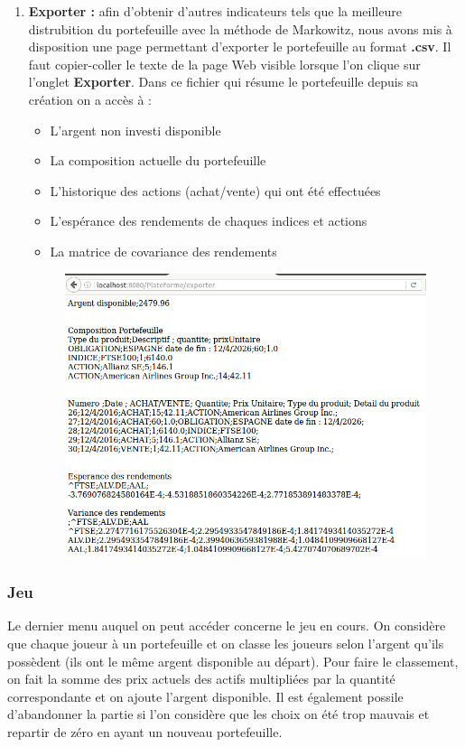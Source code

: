 \begin{enumerate}
\begin{enumerate}
      \end{enumerate}

      \item \textbf{Exporter :} afin d'obtenir d'autres indicateurs tels que la meilleure distrubition du portefeuille avec la méthode de Markowitz, nous avons mis à disposition une page permettant d'exporter le portefeuille au format \textbf{.csv}. Il faut copier-coller le texte de la page Web visible lorsque l'on clique sur l'onglet \textbf{Exporter}. Dans ce fichier qui résume le portefeuille depuis sa création on a accès à :
      \begin{itemize}
       \item L'argent non investi disponible
       \item La composition actuelle du portefeuille
       \item L'historique des actions (achat/vente) qui ont été effectuées
       \item L'espérance des rendements de chaques indices et actions
       \item La matrice de covariance des rendements
      \end{itemize}

      \begin{figure}[H]
	\center	
	\includegraphics[scale=0.5]{../graph/7-exporterpage.png}
      \end{figure}

    \end{enumerate}
  
    \subsubsection{Jeu}
    Le dernier menu auquel on peut accéder concerne le jeu en cours. On considère que chaque joueur à un portefeuille et on classe les joueurs selon l'argent qu'ils possèdent (ils ont le même argent disponible au départ). Pour faire le classement, on fait la somme des prix actuels des actifs multipliées par la quantité correspondante et on ajoute l'argent disponible. Il est également possile d'abandonner la partie si l'on considère que les choix on été trop mauvais et repartir de zéro en ayant un nouveau portefeuille.
  
